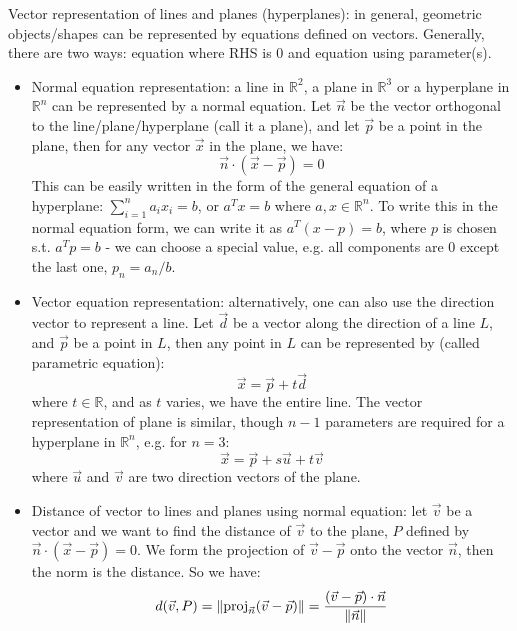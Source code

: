 \documentclass{report}
\begin{document}
Vector representation of lines and planes (hyperplanes): in general, geometric objects/shapes can be represented by equations defined on vectors. Generally, there are two ways: equation where RHS is 0 and equation using parameter(s).
\begin{itemize}
\item Normal equation representation: a line in $\mathbb{R}^2$, a plane in $\mathbb{R}^3$ or a hyperplane in $\mathbb{R}^n$ can be represented by a normal equation. Let $\vec{n}$ be the vector orthogonal to the line/plane/hyperplane (call it a plane), and let $\vec{p}$ be a point in the plane, then for any vector $\vec{x}$ in the plane, we have: 
\begin{equation}
\vec{n} \cdot (\vec{x} - \vec{p}) = 0	
\end{equation}
This can be easily written in the form of the general equation of a hyperplane: $\sum_{i=1}^n a_i x_i = b$, or $a^T x = b$ where $a, x \in \mathbb{R}^n$. To write this in the normal equation form, we can write it as $a^T (x - p) = b$, where $p$ is chosen s.t. $a^T p = b$ - we can choose a special value, e.g. all components are 0 except the last one, $p_n = a_n / b$. 

\item Vector equation representation: alternatively, one can also use the direction vector to represent a line. Let $\vec{d}$ be a vector along the direction of a line $L$, and $\vec{p}$ be a point in $L$, then any point in $L$ can be represented by (called parametric equation): 
\begin{equation}
\vec{x} = \vec{p} + t \vec{d}	
\end{equation}
where $t \in \mathbb{R}$, and as $t$ varies, we have the entire line. The vector representation of plane is similar, though $n-1$ parameters are required for a hyperplane in $\mathbb{R}^n$, e.g. for $n = 3$: 
\begin{equation}
\vec{x} = \vec{p} + s \vec{u}	+ t \vec{v}
\end{equation}
where $\vec{u}$ and $\vec{v}$ are two direction vectors of the plane. 

\item Distance of vector to lines and planes using normal equation: let $\vec{v}$ be a vector and we want to find the distance of $\vec{v}$ to the plane, $P$ defined by $\vec{n} \cdot (\vec{x} - \vec{p}) = 0$. We form the projection of $\vec{v} - \vec{p}$ onto the vector $\vec{n}$, then the norm is the distance. So we have: 
\begin{equation}
d(\vec{v}, P) = \lVert\text{proj}_{\vec{n}}(\vec{v}-\vec{p})\rVert	= \frac{(\vec{v}-\vec{p}) \cdot \vec{n}}{\lVert\vec{n}\rVert}
\end{equation}


\end{itemize}
\end{document}
